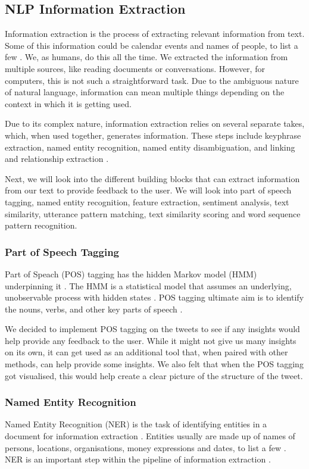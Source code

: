 	\subsection{NLP Information Extraction}
	Information extraction is the process of extracting relevant information from text. Some of this information could be calendar events and names of people, to list a few \cite{vajjala2020practical}. We, as humans, do this all the time. We extracted the information from multiple sources, like reading documents or conversations. However, for computers, this is not such a straightforward task. Due to the ambiguous nature of natural language, information can mean multiple things depending on the context in which it is getting used.
	
	Due to its complex nature, information extraction relies on several separate takes, which, when used together, generates information. These steps include keyphrase extraction, named entity recognition, named entity disambiguation, and linking and relationship extraction \cite{vajjala2020practical}.
	
	Next, we will look into the different building blocks that can extract information from our text to provide feedback to the user. We will look into part of speech tagging, named entity recognition, feature extraction, sentiment analysis, text similarity, utterance pattern matching, text similarity scoring and word sequence pattern recognition.
	
	\subsubsection{Part of Speech Tagging}
	Part of Speach (POS) tagging has the hidden Markov model (HMM) underpinning it \cite{vajjala2020practical}. The HMM is a statistical model that assumes an underlying, unobservable process with hidden states \cite{baum1966statistical}. POS tagging ultimate aim is to identify the nouns, verbs, and other key parts of speech \cite{vasiliev2020natural}.
	
	We decided to implement POS tagging on the tweets to see if any insights would help provide any feedback to the user. While it might not give us many insights on its own, it can get used as an additional tool that, when paired with other methods, can help provide some insights. We also felt that when the POS tagging got visualised, this would help create a clear picture of the structure of the tweet.
	
	
	\subsubsection{Named Entity Recognition}
	Named Entity Recognition (NER) is the task of identifying entities in a document for information extraction \cite{vajjala2020practical}. Entities usually are made up of names of persons, locations, organisations, money expressions and dates, to list a few \cite{hapke2019natural}. NER is an important step within the pipeline of information extraction \cite{vajjala2020practical}.
	
